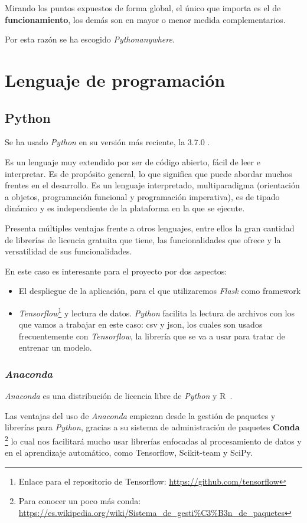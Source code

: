 Mirando los puntos expuestos de forma global, el único que importa es el de \textbf{funcionamiento}, los demás son en mayor o menor medida complementarios.

Por esta razón se ha escogido \textit{Pythonanywhere}.


\section{Lenguaje de programación}
\subsection{Python}
Se ha usado \textit{Python} en su versión más reciente, la 3.7.0 \cite{python}.

Es un lenguaje muy extendido por ser de código abierto, fácil de leer e interpretar.
Es de propósito general, lo que significa que puede abordar muchos frentes en el desarrollo. Es un lenguaje interpretado, multiparadigma (orientación a objetos, programación funcional y programación imperativa), es de tipado dinámico y es independiente de la plataforma en la que se ejecute.

Presenta múltiples ventajas frente a otros lenguajes, entre ellos la gran cantidad de librerías de licencia gratuita que tiene, las funcionalidades que ofrece y la versatilidad de sus funcionalidades.

En este caso es interesante para el proyecto por dos aspectos: 
\begin{itemize}
	\item El despliegue de la aplicación, para el que utilizaremos \textit{Flask} como framework 
	\item \textit{Tensorflow}\footnote{Enlace para el repositorio de Tensorflow: \url{https://github.com/tensorflow}} y lectura de datos. \textit{Python} facilita la lectura de archivos con los que vamos a trabajar en este caso: csv y json, los cuales son usados frecuentemente con \textit{Tensorflow}, la librería que se va a usar para tratar de entrenar un modelo. 
\end{itemize}
\subsubsection{\textit{Anaconda}}
\textit{Anaconda} es una distribución de licencia libre de \textit{Python} y R~\cite{ana}.

Las ventajas del uso de \textit{Anaconda} empiezan desde la gestión de paquetes y librerías para \textit{Python}, gracias a su sistema de administración de paquetes \textbf{Conda} \footnote{Para conocer un poco más conda: \url{https://es.wikipedia.org/wiki/Sistema_de_gesti\%C3\%B3n_de_paquetes}}
lo cual nos facilitará mucho usar librerías enfocadas al procesamiento de datos y en el aprendizaje automático, como Tensorflow, Scikit-team y SciPy.


